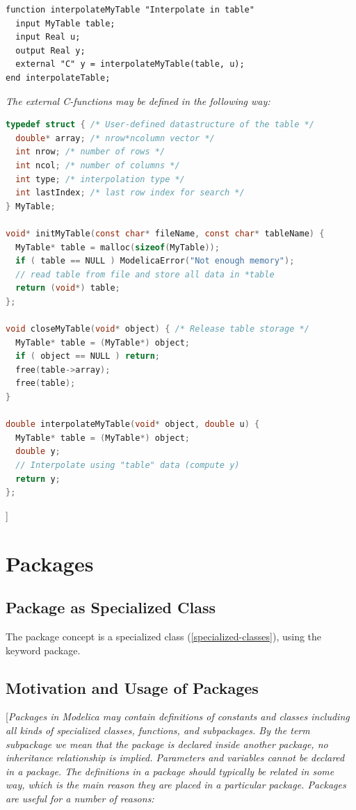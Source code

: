 \documentclass[10pt,a4paper]{report}
\def\doublelabel#1{\label{#1}}
\begin{document}
\begin{lstlisting}[language=modelica]
function interpolateMyTable "Interpolate in table"
  input MyTable table;
  input Real u;
  output Real y;
  external "C" y = interpolateMyTable(table, u);
end interpolateTable;
\end{lstlisting}
\emph{The external C-functions may be defined in the following way:}
\begin{lstlisting}[language=C]
typedef struct { /* User-defined datastructure of the table */
  double* array; /* nrow*ncolumn vector */
  int nrow; /* number of rows */
  int ncol; /* number of columns */
  int type; /* interpolation type */
  int lastIndex; /* last row index for search */
} MyTable;

void* initMyTable(const char* fileName, const char* tableName) {
  MyTable* table = malloc(sizeof(MyTable));
  if ( table == NULL ) ModelicaError("Not enough memory");
  // read table from file and store all data in *table
  return (void*) table;
};

void closeMyTable(void* object) { /* Release table storage */
  MyTable* table = (MyTable*) object;
  if ( object == NULL ) return;
  free(table->array);
  free(table);
}

double interpolateMyTable(void* object, double u) {
  MyTable* table = (MyTable*) object;
  double y;
  // Interpolate using "table" data (compute y)
  return y;
};
\end{lstlisting}
{]}

\chapter{Packages}\doublelabel{packages}

\section{Package as Specialized Class}\doublelabel{package-as-specialized-class}

The package concept is a specialized class (\ref{specialized-classes}), using the
keyword package.

\section{Motivation and Usage of Packages}\doublelabel{motivation-and-usage-of-packages}

{[}\emph{Packages in Modelica may contain definitions of constants and
classes including all kinds of specialized classes, functions, and
subpackages. By the term subpackage we mean that the package is declared
inside another package, no inheritance relationship is implied.
Parameters and variables cannot be declared in a package. The
definitions in a package should typically be related in some way, which
is the main reason they are placed in a particular package. Packages are
useful for a number of reasons:}
\end{document}
